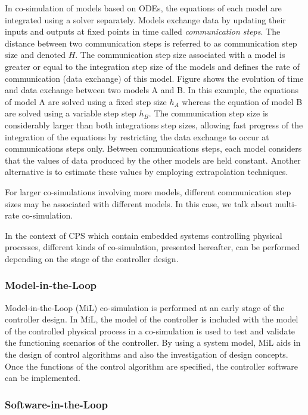 In co-simulation of models based on ODEs, the equations of each model are integrated using a solver separately. Models exchange data by updating their inputs and outputs at fixed points in time called \textit{communication steps}. The distance between two communication steps is referred to as communication step size and denoted $H$. The communication step size associated with a model is greater or equal to the integration step size of the models and defines the rate of communication (data exchange) of this model. Figure shows the evolution of time and data exchange between two models A and B. In this example, the equations of model A are solved using a fixed step size $h_A$ whereas the equation of model B are solved using a variable step step $h_B$. The communication step size is considerably larger than both integrations step sizes, allowing fast progress of the integration of the equations by restricting the data exchange to occur at communications steps only. Between communications steps, each model considers that the values of data produced by the other models are held constant. Another alternative is to estimate these values by employing extrapolation techniques.

For larger co-simulations involving more models, different communication step sizes may be associated with different models. In this case, we talk about multi-rate co-simulation.

In the context of CPS which contain embedded systems controlling physical processes, different kinds of co-simulation, presented hereafter, can be performed depending on the stage of the controller design.

\subsubsection{Model-in-the-Loop}

Model-in-the-Loop (MiL) co-simulation is performed at an early stage of the controller design. In MiL, the model of the controller is included with the model of the controlled physical process in a co-simulation is used to test and validate the functioning scenarios of the controller. By using a system model, MiL aids in the design of control algorithms and also the investigation of design concepts. Once the functions of the control algorithm are specified, the controller software can be implemented.

\subsubsection{Software-in-the-Loop}

